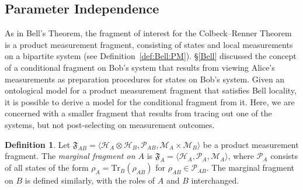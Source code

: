 \documentclass[DIV=calc,paper=a4,fontsize=11pt,twocolumn]{scrartcl} %
\theoremstyle{definition}
\newtheorem{definition}{Definition}[section]
\theoremstyle{plain}
\newcommand{\Hilb}[1][]{\ensuremath{\mathcal{H}_{#1}}}
\newcommand{\Tr}[2][]{\ensuremath{\text{Tr}_{#1} \left ( #2 \right )}}
\begin{document}
\subsection{Parameter Independence}

\label{CR:PI}

As in Bell's Theorem, the fragment of interest for the Colbeck--Renner
Theorem is a product measurement fragment, consisting of states and
local measurements on a bipartite system (see
Definition~\ref{def:Bell:PM}).  \S\ref{Bell} discussed the concept of
a conditional fragment on Bob's system that results from viewing
Alice's measurements as preparation procedures for states on Bob's
system.  Given an ontological model for a product measurement fragment
that satisfies Bell locality, it is possible to derive a model for the
conditional fragment from it.  Here, we are concerned with a smaller
fragment that results from tracing out one of the systems, but not
post-selecting on measurement outcomes.

\begin{definition}
Let $\mathfrak{F}_{AB} = \langle \Hilb[A] \otimes \Hilb[B],
\mathcal{P}_{AB}, \mathcal{M}_A \times \mathcal{M}_B \rangle$ be a
product measurement fragment.  The \emph{marginal fragment on $A$}
is $\mathfrak{F}_A = \langle \Hilb[A], \mathcal{P}_A, \mathcal{M}_A
\rangle$, where $\mathcal{P}_A$ consists of all states of the form
$\rho_A = \Tr[B]{\rho_{AB}}$ for $\rho_{AB} \in \mathcal{P}_{AB}$.
The marginal fragment on $B$ is defined similarly, with the roles
of $A$ and $B$ interchanged.
\end{definition}
\end{document}
